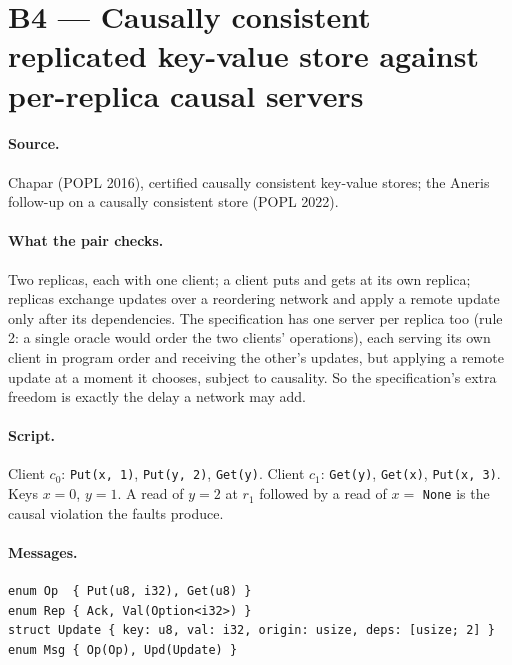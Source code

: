 \documentclass[11pt,a4paper]{article}
\newcommand{\code}[1]{\texttt{#1}}
\begin{document}
\section{B4 --- Causally consistent replicated key-value store against per-replica causal servers}

\paragraph{Source.} Chapar (POPL 2016), certified causally consistent key-value stores; the
Aneris follow-up on a causally consistent store (POPL 2022).

\paragraph{What the pair checks.} Two replicas, each with one client; a client puts and gets at
its own replica; replicas exchange updates over a reordering network and apply a remote update
only after its dependencies. The specification has one server per replica too (rule 2: a single
oracle would order the two clients' operations), each serving its own client in program order
and receiving the other's updates, but applying a remote update at a moment it chooses, subject
to causality. So the specification's extra freedom is exactly the delay a network may add.

\paragraph{Script.} Client $c_0$: \code{Put(x, 1)}, \code{Put(y, 2)}, \code{Get(y)}. Client
$c_1$: \code{Get(y)}, \code{Get(x)}, \code{Put(x, 3)}. Keys $x = 0$, $y = 1$. A read of $y = 2$
at $r_1$ followed by a read of $x = $ \code{None} is the causal violation the faults produce.

\paragraph{Messages.}
\begin{lstlisting}
enum Op  { Put(u8, i32), Get(u8) }
enum Rep { Ack, Val(Option<i32>) }
struct Update { key: u8, val: i32, origin: usize, deps: [usize; 2] }
enum Msg { Op(Op), Upd(Update) }
\end{lstlisting}
\end{document}
